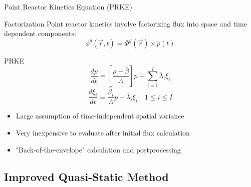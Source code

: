 \documentclass[8pt,xcolor=dvipnames]{beamer}
\newcommand{\be}{\begin{equation*}}
\newcommand{\ee}{\end{equation*}}
\newcommand{\vr}{\vec{r}}
\begin{document}
\begin{frame}{Point Reactor Kinetics Equation (PRKE)}

\begin{block}{Factorization}
Point reactor kinetics involve factorizing flux into space and time dependent components:
\be
\phi^g(\vr,t) = \Phi^g(\vr)\times p(t)
\ee
\end{block}

\begin{block}{PRKE}
\[
\frac{dp}{dt}=\left[\frac{\rho-\bar{\beta}}{\Lambda}\right]p+\sum_{i=1}^I\bar{\lambda}_i\xi_i
\]
\[
\frac{d\xi_i}{dt}=\frac{\bar{\beta}_i}{\Lambda}p - \bar{\lambda}_i\xi_i \quad 1 \le i \le I 
\]
\end{block}

\begin{block}{}
\begin{itemize}
\item Large assumption of time-independent spatial variance
\item Very inexpensive to evaluate after initial flux calculation
\item "Back-of-the-envelope" calculation and postprocessing
\end{itemize}
\end{block}

\end{frame}

\subsection{Improved Quasi-Static Method}
\end{document}
